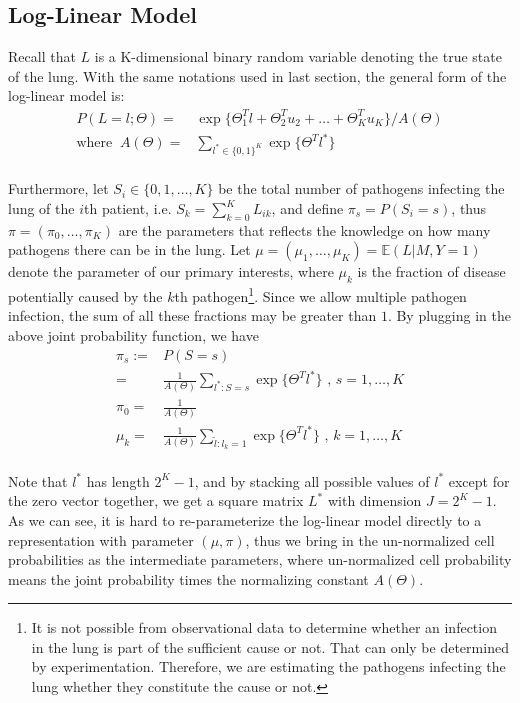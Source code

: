 \documentclass[11 pt, a4paper]{article}  %
\begin{document}
\subsection{Log-Linear Model}
Recall that $L$ is a K-dimensional binary random variable denoting the true state of the lung. With the same notations used in last section, the general form of the log-linear model is:
\begin{align*}
P(L=l; \Theta) = & \exp \{\Theta_1^T l + \Theta_2^{T} u_2 + \ldots + \Theta_K^T u_K\}/ A(\Theta) \\
\text{where }\ 
A(\Theta) = & \sum_{l^* \in \{0,1\}^K}\exp \{ \Theta^T l^*\}
\end{align*}
\\
Furthermore, let $S_i \in \{0,1,\ldots, K\}$ be the total number of pathogens infecting the lung of the $i$th patient, i.e. $S_k=\sum_{k=0}^K L_{ik}$, and define $\pi_s=P(S_i=s)$, thus $\pi=(\pi_0,\ldots,\pi_K)$ are the parameters that reflects the knowledge on how many pathogens there can be in the lung. Let $\mu = (\mu_1, \ldots,\mu_K) = \mathbb{E}(L|M,Y=1)$ denote the parameter of our primary interests, where $\mu_k$ is the fraction of disease potentially caused by the $k$th pathogen\footnote{ It is not possible from observational data to determine whether an infection in the lung is part of the sufficient cause or not. That can only be determined by experimentation. Therefore, we are estimating the pathogens infecting the lung whether they constitute the cause or not.}. Since we allow multiple pathogen infection, the sum of all these fractions may be greater than $1$. By plugging in the above joint probability function, we have
\begin{align}
\pi_s := & P(S=s)\nonumber \\ 
= & \frac{1}{A(\Theta)} \sum_{l^*:S=s}\exp \{ \Theta^T l^*\}  \text{ , } s = 1,\ldots, K \\
\pi_0 = & \frac{1}{A(\Theta)} \nonumber \\
\mu_k = & \frac{1}{A(\Theta)} \sum_{\tilde{l}:l_k=1}\exp \{ \Theta^T l^*\}  \text{ , } k = 1, \ldots, K
\end{align}
\\
Note that $l^*$ has length $2^K-1$, and by stacking all possible values of $l^*$ except for the zero vector together, we get a square matrix $L^*$ with dimension $J = 2^K-1$.
As we can see, it is hard to re-parameterize the log-linear model directly to a representation with parameter $(\mu, \pi)$, thus we bring in the un-normalized cell probabilities as the intermediate parameters, where un-normalized cell probability means the joint probability times the normalizing constant $A(\Theta)$.\\
\end{document}
